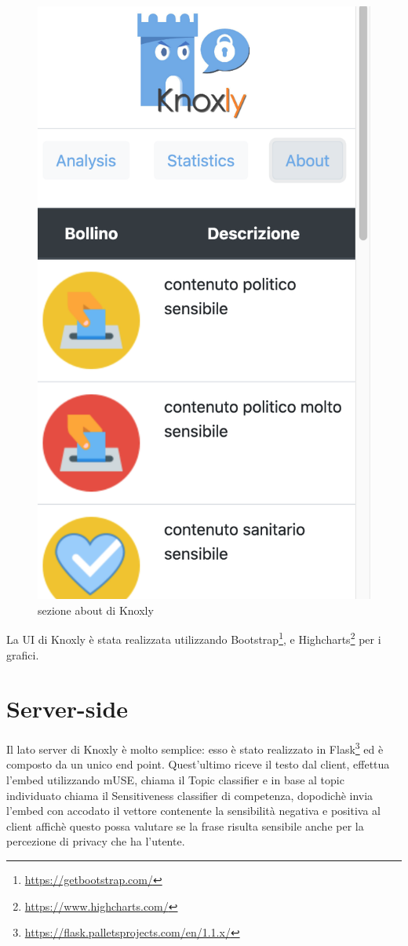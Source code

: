 \begin{figure}[h]
    \centering
    \includegraphics[scale=0.7]{Figure/ui/about.png}
    \caption{sezione about di Knoxly}
    \label{fig:about}
\end{figure}
\FloatBarrier

La UI di Knoxly è stata realizzata utilizzando Bootstrap\footnote{\url{https://getbootstrap.com/}}, e Highcharts\footnote{\url{https://www.highcharts.com/}} per i grafici.

\section{Server-side}
\label{sec:backend}
Il lato server di Knoxly è molto semplice: esso è stato realizzato in Flask\footnote{\url{https://flask.palletsprojects.com/en/1.1.x/}} ed è composto da un unico end point. Quest'ultimo riceve il testo dal client, effettua l'embed utilizzando mUSE, chiama il Topic classifier e in base al topic individuato chiama il Sensitiveness classifier di competenza, dopodichè invia l'embed con accodato il vettore contenente la sensibilità negativa e positiva al client affichè questo possa valutare se la frase risulta sensibile anche per la percezione di privacy che ha l'utente.